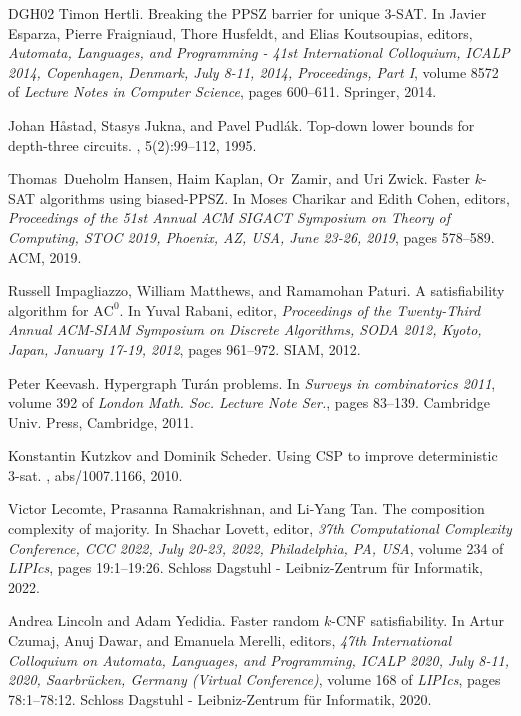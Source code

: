 \documentclass[10pt,a4paper]{article}
\begin{document}
\begin{thebibliography}{DGH{\etalchar{+}}02}
Timon Hertli.
\newblock Breaking the {PPSZ} barrier for unique 3-{SAT}.
\newblock In Javier Esparza, Pierre Fraigniaud, Thore Husfeldt, and Elias
  Koutsoupias, editors, {\em Automata, Languages, and Programming - 41st
  International Colloquium, {ICALP} 2014, Copenhagen, Denmark, July 8-11, 2014,
  Proceedings, Part {I}}, volume 8572 of {\em Lecture Notes in Computer
  Science}, pages 600--611. Springer, 2014.

Johan H{\aa}stad, Stasys Jukna, and Pavel Pudl{\'{a}}k.
\newblock Top-down lower bounds for depth-three circuits.
, 5(2):99--112, 1995.

Thomas~Dueholm Hansen, Haim Kaplan, Or~Zamir, and Uri Zwick.
\newblock Faster $k$-{SAT} algorithms using biased-{PPSZ}.
\newblock In Moses Charikar and Edith Cohen, editors, {\em Proceedings of the
  51st Annual {ACM} {SIGACT} Symposium on Theory of Computing, {STOC} 2019,
  Phoenix, AZ, USA, June 23-26, 2019}, pages 578--589. {ACM}, 2019.

Russell Impagliazzo, William Matthews, and Ramamohan Paturi.
\newblock A satisfiability algorithm for $\text{AC}^0$.
\newblock In Yuval Rabani, editor, {\em Proceedings of the Twenty-Third Annual
  {ACM-SIAM} Symposium on Discrete Algorithms, {SODA} 2012, Kyoto, Japan,
  January 17-19, 2012}, pages 961--972. {SIAM}, 2012.

Peter Keevash.
\newblock Hypergraph {T}ur\'{a}n problems.
\newblock In {\em Surveys in combinatorics 2011}, volume 392 of {\em London
  Math. Soc. Lecture Note Ser.}, pages 83--139. Cambridge Univ. Press,
  Cambridge, 2011.

Konstantin Kutzkov and Dominik Scheder.
\newblock Using {CSP} to improve deterministic 3-sat.
, abs/1007.1166, 2010.

Victor Lecomte, Prasanna Ramakrishnan, and Li{-}Yang Tan.
\newblock The composition complexity of majority.
\newblock In Shachar Lovett, editor, {\em 37th Computational Complexity
  Conference, {CCC} 2022, July 20-23, 2022, Philadelphia, PA, {USA}}, volume
  234 of {\em LIPIcs}, pages 19:1--19:26. Schloss Dagstuhl - Leibniz-Zentrum
  f{\"{u}}r Informatik, 2022.

Andrea Lincoln and Adam Yedidia.
\newblock Faster random $k$-{CNF} satisfiability.
\newblock In Artur Czumaj, Anuj Dawar, and Emanuela Merelli, editors, {\em 47th
  International Colloquium on Automata, Languages, and Programming, {ICALP}
  2020, July 8-11, 2020, Saarbr{\"{u}}cken, Germany (Virtual Conference)},
  volume 168 of {\em LIPIcs}, pages 78:1--78:12. Schloss Dagstuhl -
  Leibniz-Zentrum f{\"{u}}r Informatik, 2020.


\end{thebibliography}
\end{document}
